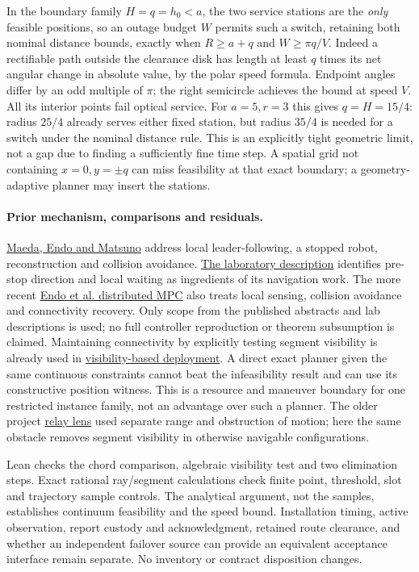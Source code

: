 \documentclass{article}
\begin{document}
In the boundary family \(H=q=h_0<a\), the two service stations are the
\emph{only} feasible positions, so an outage budget \(W\) permits
such a switch, retaining both nominal distance bounds, exactly when
\(R\ge a+q\) and \(W\ge\pi q/V\). Indeed a rectifiable path outside the
clearance disk has length at least \(q\) times its net angular change
in absolute value, by the polar speed formula. Endpoint angles differ
by an odd multiple of \(\pi\); the right semicircle achieves the bound
at speed \(V\). All its interior points fail optical service.
For \(a=5,r=3\) this gives \(q=H=15/4\): radius \(25/4\) already serves
either fixed station, but radius \(35/4\) is needed for a switch under
the nominal distance rule. This is an explicitly tight geometric
limit, not a gap due to finding a sufficiently fine time step.
A spatial grid not containing \(x=0,y=\pm q\) can miss feasibility at
that exact boundary; a geometry-adaptive planner may insert the stations.

\paragraph{Prior mechanism, comparisons and residuals.}
\href{https://doi.org/10.1016/j.jfranklin.2023.05.013}{Maeda, Endo and Matsuno}
address local leader-following, a stopped robot, reconstruction and
collision avoidance.
\href{https://en.endo-lab.jp/research/detail/499}{The laboratory description}
identifies pre-stop direction and local waiting as ingredients of its
navigation work. The more recent
\href{https://doi.org/10.1109/TASE.2026.3741309}{Endo et al. distributed MPC}
also treats local sensing, collision avoidance and connectivity recovery.
Only scope from the published abstracts and lab descriptions is used;
no full controller reproduction or theorem subsumption is claimed.
Maintaining connectivity by explicitly testing segment visibility is
already used in
\href{https://experts.umn.edu/en/publications/visibility-based-deployment-of-robot-formations-for-communication/}{visibility-based deployment}.
A direct exact planner given the same continuous constraints cannot beat
the infeasibility result and can use its constructive position witness.
This is a resource and maneuver boundary for one restricted instance
family, not an advantage over such a planner. The older project
\href{https://github.com/eternal-november/eos-research-programmes/pull/396}{relay lens}
used separate range and obstruction of motion; here the same obstacle
removes segment visibility in otherwise navigable configurations.

Lean checks the chord comparison, algebraic visibility test and two
elimination steps. Exact rational ray/segment calculations check
finite point, threshold, slot and trajectory sample controls. The
analytical argument, not the samples, establishes continuum feasibility
and the speed bound. Installation timing, active observation, report
custody and acknowledgment, retained route clearance, and whether an
independent failover source can provide an equivalent acceptance
interface remain separate. No inventory or contract disposition changes.
\end{document}
